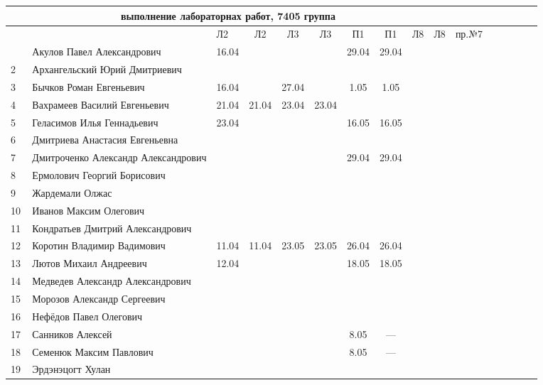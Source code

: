 \documentclass[a4paper,11pt]{article}
\begin{document}
\newpage
%
\hspace{-2cm} %
\begin{tabular}{l|llccccccccccccc}
\multicolumn{10}{c}{выполнение лабораторнах работ, 7405 группа} \\
\toprule
&&Л2&Л2& Л3&Л3& П1&П1& Л8&Л8&пр.№7\\
\midrule
\,&Акулов Павел Александрович             &16.04&     &     &     &29.04&29.04&&&\\
2\,&Архангельский Юрий Дмитриевич         &     &     &     &     &&&&\\
3\,&Бычков Роман Евгеньевич               &16.04&     &27.04&     & 1.05& 1.05&&&\\
4\,&Вахрамеев Василий Евгеньевич          &21.04&21.04&23.04&23.04&&&&\\
5\,&Геласимов Илья Геннадьевич            &23.04&     &     &     &16.05&16.05&&\\
\midrule
6\,&Дмитриева Анастасия Евгеньевна        &     &     &     &     &&&&\\
7\,&Дмитроченко Александр Александрович   &     &     &     &     &29.04&29.04&&&\\
8\,&Ермолович Георгий Борисович           &     &     &     &     &&&&\\
9\,&Жардемали Олжас                       &     &     &     &     &&&&\\
10\,&Иванов Максим Олегович               &&&&&&&&\\
\midrule
11\,&Кондратьев Дмитрий Александрович     &&&&&&&&\\
12\,&Коротин Владимир Вадимович           &11.04&11.04&23.05&23.05&26.04&26.04&&&\\
13\,&Лютов Михаил Андреевич               &12.04&     &     &     &18.05&18.05&&\\
14\,&Медведев Александр Александрович     &&&&&&&&\\
15\,&Морозов Александр Сергеевич          &&&&&&&&\\
\midrule
16\,&Нефёдов Павел Олегович               &&&&&&&&\\
17\,&Санников Алексей                     &     &     &     &     & 8.05& --- &&&\\
18\,&Семенюк Максим Павлович              &     &     &     &     & 8.05& --- &&&\\
19\,&Эрдэнэцогт Хулан                     &&&&&&&&\\
\bottomrule
\end{tabular}
\end{document}
